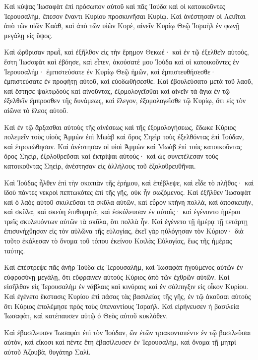 {Καὶ κύψας Ἰωσαφὰτ ἐπὶ πρόσωπον αὐτοῦ καὶ πᾶς Ἰούδα καὶ οἱ κατοικοῦντες Ἱερουσαλὴμ, ἔπεσον ἔναντι Κυρίου προσκυνῆσαι Κυρίῳ.
Καὶ ἀνέστησαν οἱ Λευῖται ἀπὸ τῶν υἱῶν Καὰθ, καὶ ἀπὸ τῶν υἱῶν Κορὲ, αἰνεῖν Κυρίῳ Θεῷ Ἰσραὴλ ἐν φωνῇ μεγάλῃ εἰς ὕψος.
\par }{\PP {}Καὶ ὤρθρισαν πρωῒ, καὶ ἐξῆλθον εἰς τὴν ἔρημον Θεκωέ· καὶ ἐν τῷ ἐξελθεῖν αὐτοὺς, ἔστη Ἰωσαφὰτ καὶ ἐβόησε, καὶ εἶπεν, ἀκούσατέ μου Ἰούδα καὶ οἱ κατοικοῦντες ἐν Ἱερουσαλήμ· ἐμπιστεύσατε ἐν Κυρίῳ Θεῷ ἡμῶν, καὶ ἐμπιστευθήσεσθε· ἐμπιστεύσατε ἐν προφήτῃ αὐτοῦ, καὶ εὐοδωθήσεσθε.
Καὶ ἐβουλεύσατο μετὰ τοῦ λαοῦ, καὶ ἔστησε ψαλτῳδοὺς καὶ αἰνοῦντας, ἐξομολογεῖσθαι καὶ αἰνεῖν τὰ ἅγια ἐν τῷ ἐξελθεῖν ἔμπροσθεν τῆς δυνάμεως, καὶ ἔλεγον, ἐξομολογεῖσθε τῷ Κυρίῳ, ὅτι εἰς τὸν αἰῶνα τὸ ἔλεος αὐτοῦ.
\par }{\PP {}Καὶ ἐν τῷ ἄρξασθαι αὐτοὺς τῆς αἰνέσεως καὶ τῆς ἐξομολογήσεως, ἔδωκε Κύριος πολεμεῖν τοὺς υἱοὺς Ἀμμὼν ἐπὶ Μωὰβ καὶ ὄρος Σηεὶρ τοὺς ἐξελθόντας ἐπὶ Ἰούδαν, καὶ ἐτροπώθησαν.
Καὶ ἀνέστησαν οἱ υἱοὶ Ἀμμὼν καὶ Μωὰβ ἐπὶ τοὺς κατοικοῦντας ὄρος Σηεὶρ, ἐξολοθρεῦσαι καὶ ἐκτρίψαι αὐτούς· καὶ ὡς συνετέλεσαν τοὺς κατοικοῦντας Σηεὶρ, ἀνέστησαν εἰς ἀλλήλους τοῦ ἐξολοθρευθῆναι.
\par }{\PP {}Καὶ Ἰούδας ἦλθεν ἐπὶ τὴν σκοπιὰν τῆς ἐρήμου, καὶ ἐπέβλεψε, καὶ εἶδε τὸ πλῆθος· καὶ ἰδοὺ πάντες νεκροὶ πεπτωκότες ἐπὶ τῆς γῆς, οὐκ ἦν σωζόμενος.
Καὶ ἐξῆλθεν Ἰωσαφὰτ καὶ ὁ λαὸς αὐτοῦ σκυλεῦσαι τὰ σκῦλα αὐτῶν, καὶ εὗρον κτήνη πολλὰ, καὶ ἀποσκευὴν, καὶ σκῦλα, καὶ σκεύη ἐπιθυμητὰ, καὶ ἐσκύλευσαν ἐν αὐτοῖς· καὶ ἐγένοντο ἡμέραι τρεῖς σκυλευόντων αὐτῶν τὰ σκῦλα, ὅτι πολλὰ ἦν.
Καὶ ἐγένετο τῇ ἡμέρᾳ τῇ τετάρτῃ ἐπισυνήχθησαν εἰς τὸν αὐλῶνα τῆς εὐλογίας, ἐκεῖ γὰρ ηὐλόγησαν τὸν Κύριον· διὰ τοῦτο ἐκάλεσαν τὸ ὄνομα τοῦ τόπου ἐκείνου Κοιλὰς Εὐλογίας, ἕως τῆς ἡμέρας ταύτης.
\par }{\PP {}Καὶ ἐπέστρεψε πᾶς ἀνὴρ Ἰούδα εἰς Ἱερουσαλὴμ, καὶ Ἰωσαφὰτ ἡγούμενος αὐτῶν ἐν εὐφροσύνῃ μεγάλῃ, ὅτι εὔφραινεν αὐτοὺς Κύριος ἀπὸ τῶν ἐχθρῶν αὐτῶν.
Καὶ εἰσῆλθον εἰς Ἱερουσαλὴμ ἐν νάβλαις καὶ κινύραις καὶ ἐν σάλπιγξιν εἰς οἶκον Κυρίου.
Καὶ ἐγένετο ἔκστασις Κυρίου ἐπὶ πάσας τὰς βασιλείας τῆς γῆς, ἐν τῷ ἀκοῦσαι αὐτοὺς ὅτι Κύριος ἐπολέμησε πρὸς τοὺς ὑπεναντίους Ἰσραήλ.
Καὶ εἰρήνευσεν ἡ βασιλεία Ἰωσαφὰτ, καὶ κατέπαυσεν αὐτῷ ὁ Θεὸς αὐτοῦ κυκλόθεν.
\par }{\PP {}Καὶ ἐβασίλευσεν Ἰωσαφὰτ ἐπὶ τὸν Ἰούδαν, ὢν ἐτῶν τριακονταπέντε ἐν τῷ βασιλεῦσαι αὐτὸν, καὶ εἴκοσι καὶ πέντε ἔτη ἐβασίλευσεν ἐν Ἱερουσαλὴμ, καὶ ὄνομα τῇ μητρὶ αὐτοῦ Ἀζουβὰ, θυγάτηρ Σαλί.
}
